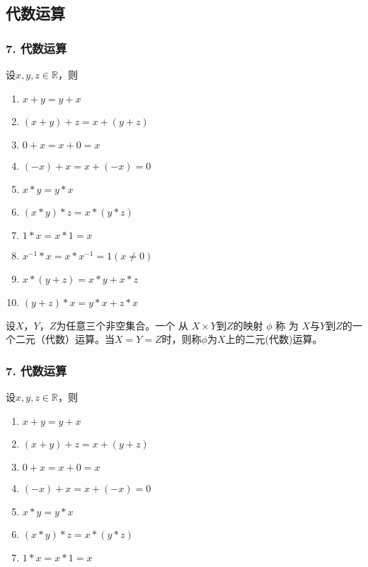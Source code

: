 \documentclass{beamer}
\begin{document}
\begin{CJK*}{UTF8}{gbsn}
\section{代数运算}
\begin{frame}
  \frametitle{7. 代数运算}
  \begin{minipage}[t]{0.5\linewidth}
    设$x, y, z \in \mathbb{R}$，则
   \begin{enumerate}
   \item   $x + y = y + x$
   \item   $(x + y) + z = x + (y + z)$
   \item   $0 + x = x + 0 = x$
   \item   $(-x) + x =x + (-x) = 0$
   \item   $x * y = y * x$
   \item   $(x * y) * z = x * (y *z)$
   \item   $1 * x = x * 1 = x$
   \item   $x^{-1} * x = x * x^{-1} = 1(x\neq 0)$
   \item   $x* (y + z) = x * y + x * z$
   \item   $(y + z) * x = y * x + z * x$
    \end{enumerate}
\end{minipage}\pause
\begin{minipage}[t]{0.5\linewidth}
  \begin{Def}
    设$X$，$Y$，$Z$为任意三个非空集合。一个 从 $X\times Y$到$Z$的映射 $\phi$ 称 为 $X$与$Y$到$Z$的一个\alert{二元（代数）运算}。当$X=Y=Z$时，则称$\phi$为$X$上的\alert{二元(代数)运算}。
  \end{Def}
\end{minipage}
\end{frame}
\begin{frame}
  \frametitle{7. 代数运算}
  \begin{minipage}[t]{0.49\linewidth}
  \begin{block}{}
    设$x, y, z \in \mathbb{R}$，则
   \begin{enumerate}
   \item   $x + y = y + x$
   \item   $(x + y) + z = x + (y + z)$
   \item   $0 + x = x + 0 = x$
   \item   $(-x) + x =x + (-x) = 0$
   \item   $x * y = y * x$
   \item   $(x * y) * z = x * (y *z)$
   \item   $1 * x = x * 1 = x$

\end{enumerate}
\end{block}
\end{minipage}
\end{frame}
\end{CJK*}
\end{document}
